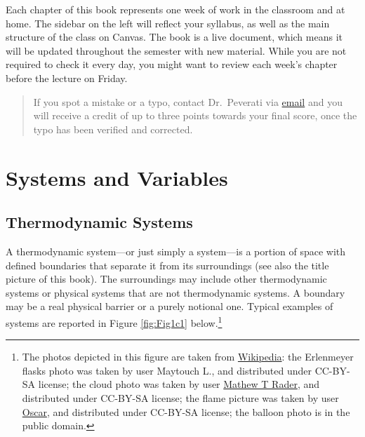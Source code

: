 \documentclass[
  9pt,
]{extbook}
\theoremstyle{definition}
\theoremstyle{definition}
\theoremstyle{definition}
\theoremstyle{remark}
\begin{document}
Each chapter of this book represents one week of work in the classroom and at home. The sidebar on the left will reflect your syllabus, as well as the main structure of the class on Canvas. The book is a live document, which means it will be updated throughout the semester with new material. While you are not required to check it every day, you might want to review each week's chapter before the lecture on Friday.

\begin{quote}
If you spot a mistake or a typo, contact Dr.~Peverati via \href{mailto:rpeverati@fit.edu}{email} and you will receive a credit of up to three points towards your final score, once the typo has been verified and corrected.
\end{quote}

\cleardoublepage
{}

\hypertarget{SystemVariables}{%
\chapter{Systems and Variables}\label{SystemVariables}}

\hypertarget{thermodynamic-systems}{%
\section{Thermodynamic Systems}\label{thermodynamic-systems}}

A thermodynamic system---or just simply a system---is a portion of space with defined boundaries that separate it from its surroundings (see also the title picture of this book). The surroundings may include other thermodynamic systems or physical systems that are not thermodynamic systems. A boundary may be a real physical barrier or a purely notional one. Typical examples of systems are reported in Figure \ref{fig:Fig1c1} below.\footnote{The photos depicted in this figure are taken from \href{https://en.wikipedia.org}{Wikipedia}: the Erlenmeyer flasks photo was taken by user Maytouch L., and distributed under CC-BY-SA license; the cloud photo was taken by user \href{https://commons.wikimedia.org/wiki/User:Matthew_T_Rader}{Mathew T Rader}, and distributed under CC-BY-SA license; the flame picture was taken by user \href{https://commons.wikimedia.org/wiki/User:Oscar}{Oscar}, and distributed under CC-BY-SA license; the balloon photo is in the public domain.}
\end{document}
